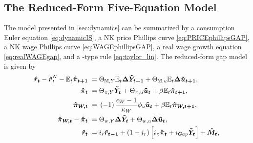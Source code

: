 \documentclass[12pt,3p,authoryear,review]{elsarticle}
\begin{document}
\subsection{The Reduced-Form Five-Equation Model}\label{sec:reduced_form_model}%
The model presented in \cref{sec:dynamics} can be summarized by a consumption Euler equation \eqref{eq:dynamicIS}, a NK price Phillips curve \eqref{eq:PRICEphillipsGAP}, a NK wage Phillips curve \eqref{eq:WAGEphillipsGAP}, a real wage growth equation \eqref{eq:realWAGEgap}, and a \cite{taylorDiscretionPolicyRules1993}-type rule \eqref{eq:taylor_lin}. The reduced-form gap model is given by%
\begin{align}%
	\boldsymbol{\hat{r}_t} - \boldsymbol{\hat{r}}^N_t - \mathbb{E}_t \boldsymbol{\hat{\pi}_{t+1}} \; = & \; \Theta_{\mathbb{M},Y} \mathbb{E}_t \boldsymbol{\Delta \tilde{Y}_{t+1}} + \Theta_{\mathbb{M},u} \mathbb{E}_t \boldsymbol{\Delta \tilde{u}_{t+1}},\label{eq:dynamicIS}\\%
	\boldsymbol{\hat{\pi}_t} \; = & \; \Theta_{\pi,Y} \boldsymbol{\tilde{Y}_{t}} + \Theta_{\pi,u} \boldsymbol{\tilde{u}_{t}} + \beta \mathbb{E}_t \boldsymbol{\hat{\pi}_{t+1}},\label{eq:PRICEphillipsGAP}\\%
	\boldsymbol{\hat{\pi}_{W,t}} \; = & \; \left(-1\right) \frac{\epsilon_W-1}{\kappa_W} \phi_u \boldsymbol{\tilde{u}_t} + \beta \mathbb{E}_t \boldsymbol{\hat{\pi}_{W,t+1}},\label{eq:WAGEphillipsGAP}\\%
	\boldsymbol{\hat{\pi}_{W,t}} - \boldsymbol{\hat{\pi}_t} \; = & \; \Theta_{w,Y} \boldsymbol{\Delta \tilde{Y}_{t}} + \Theta_{w,u} \boldsymbol{\Delta \tilde{u}_{t}},\label{eq:realWAGEgap}\\%
	\boldsymbol{\hat{r}_t} \; = & \; i_r \boldsymbol{\hat{r}_{t-1}} + \left(1-i_r\right) \Bigl[ i_\pi \boldsymbol{\hat{\pi}_t} + i_{Gap} \boldsymbol{\tilde{Y}_{t}} \Bigr] + \boldsymbol{\hat{M}_{t}},\label{eq:taylor_lin}%
\end{align}%
\end{document}
